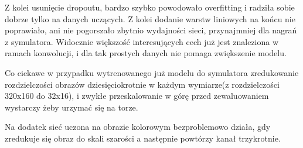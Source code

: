 Z kolei usunięcie dropoutu, bardzo szybko powodowało overfitting i radziła sobie
dobrze tylko na danych uczących. Z kolei dodanie warstw liniowych na końcu nie 
poprawiało, ani nie pogorszało zbytnio wydajności sieci, przynajmniej dla
nagrań z symulatora. Widocznie większość interesujących cech już jest znaleziona
w ramach konwolucji, i dla tak prostych danych nie pomaga zwiększenie modelu.

Co ciekawe w przypadku wytrenowanego już modelu do symulatora zredukowanie 
rozdzielczości obrazów dziesięciokrotnie w każdym wymiarze(z rozdzielczości 
320x160 do 32x16),
i zwykłe przeskalowanie w górę przed zewaluowaniem wystarczy żeby urzymać się 
na torze.

Na dodatek sieć uczona na obrazie kolorowym bezproblemowo działa, gdy
zredukuje się obraz do skali szarości a następnie powtórzy kanał trzykrotnie.

